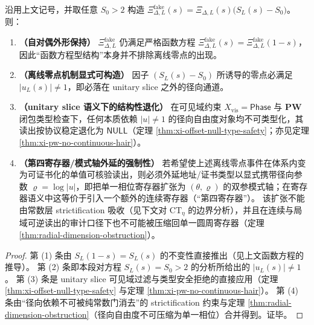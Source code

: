 \begin{proposition}\label{prop:xi-offcritical-constructible-but-null-or-extra-register}
沿用上文记号，并取任意 \(S_0>2\) 构造
\(
\Xi^{\mathrm{fake}}_{\Delta,L}(s)=\Xi_{\Delta,L}(s)\bigl(S_L(s)-S_0\bigr)
\)。
则：
\begin{enumerate}
  \item \textbf{（自对偶外形保持）}
  \(\Xi^{\mathrm{fake}}_{\Delta,L}\) 仍满足严格函数方程 \(\Xi^{\mathrm{fake}}_{\Delta,L}(s)=\Xi^{\mathrm{fake}}_{\Delta,L}(1-s)\)，因此“函数方程型结构”本身并不排除离线零点的出现。
  \item \textbf{（离线零点机制显式可构造）}
  因子 \((S_L(s)-S_0)\) 所诱导的零点必满足 \(|u_L(s)|\neq 1\)，即必落在 unitary slice 之外的径向通道。
  \item \textbf{（unitary slice 语义下的结构性退化）}
  在可见域约束 \(X_{\mathrm{vis}}=\mathsf{Phase}\) 与 \(\mathbf{PW}\) 闭包类型检查下，任何本质依赖 \(|u|\neq 1\) 的径向自由度对象均不可类型化，其读出按协议稳定退化为 \(\mathsf{NULL}\)（定理 \ref{thm:xi-offset-null-type-safety}；亦见定理 \ref{thm:xi-pw-no-continuous-hair}）。
  \item \textbf{（第四寄存器/模式轴外延的强制性）}
  若希望使上述离线零点事件在体系内变为可证书化的单值可核验读出，则必须外延地址/证书类型以显式携带径向参数 \(\varrho=\log|u|\)，即把单一相位寄存器扩张为 \((\theta,\varrho)\) 的双参模式轴；在寄存器语义中这等价于引入一个额外的连续寄存器（“第四寄存器”）。
  该扩张不能由常数层 strictification 吸收（见下文对 \(\mathrm{CT}_\eta\) 的边界分析），并且在连续与局域可逆读出的审计口径下也不可能被压缩回单一圆周寄存器（定理 \ref{thm:radial-dimension-obstruction}）。
\end{enumerate}
\end{proposition}

\begin{proof}
第 (1) 条由 \(S_L(1-s)=S_L(s)\) 的不变性直接推出（见上文函数方程的推导）。
第 (2) 条即本段对方程 \(S_L(s)=S_0>2\) 的分析所给出的 \(|u_L(s)|\neq 1\)。
第 (3) 条是 unitary slice 可见域过滤与类型安全拒绝的直接应用（定理 \ref{thm:xi-offset-null-type-safety} 与定理 \ref{thm:xi-pw-no-continuous-hair}）。
第 (4) 条由“径向依赖不可被纯常数门消去”的 strictification 约束与定理 \ref{thm:radial-dimension-obstruction}（径向自由度不可压缩为单一相位）合并得到。证毕。
\end{proof}

